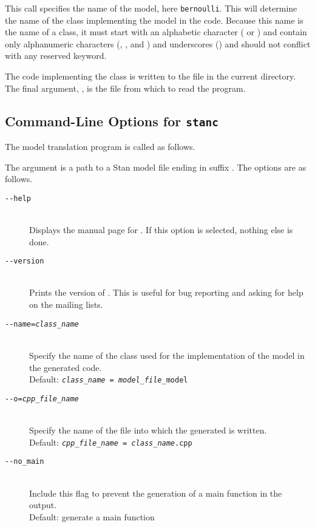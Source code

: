 This call specifies the name of the model, here {\tt bernoulli}.
This will determine the name of the class implementing the model in
the \Cpp code.  Because this name is the name of a \Cpp class, it must
start with an alphabetic character ( or ) and
contain only alphanumeric characters (, , and
) and underscores (\code{\_}) and should not conflict with
any \Cpp reserved keyword.  

The \Cpp code implementing the class is written to the file
 in the current directory.  The final argument,
, is the file from which to read the \Stan
program.

\subsection{Command-Line Options for {\tt\bfseries stanc}}

The model translation program  is called as follows.
%
\begin{quote}
\end{quote}
%
The argument  is a path to a Stan model file ending
in suffix .  The options are as follows.
%
\begin{description}
%
\item[\tt {-}-help] 
\mbox{ } \\ 
Displays the manual page for \stanc.  If this option is selected,
nothing else is done.
%
\item[\tt {-}-version]
\mbox{ } \\ 
Prints the version of \stanc.  This is useful for bug reporting
and asking for help on the mailing lists.
%
\item[\tt {-}-name={\slshape class\_name}]
\mbox{ } \\ 
Specify the name of the class used for the implementation of the
\Stan model in the generated \Cpp code.  
\\[2pt]
Default: {\tt {\slshape class\_name = model\_file}\_model}
%
\item[\tt {-}-o={\slshape cpp\_file\_name}]
\mbox{ } \\ 
Specify the name of the file into which the generated \Cpp is written.
\\[2pt]
Default: {\tt {\slshape cpp\_file\_name} = {\slshape class\_name}.cpp}
%
\item[\tt {-}-no\_main]
\mbox{ } \\
Include this flag to prevent the generation of a main function in the
output.
\\[2pt]
Default: generate a main function
\end{description}



